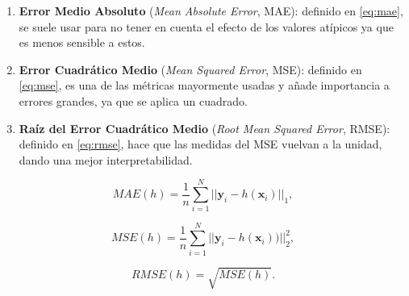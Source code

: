 \begin{enumerate}
  \item \textbf{Error Medio Absoluto} (\emph{Mean Absolute Error}, MAE): definido en \eqref{eq:mae}, se suele usar para no tener en cuenta el efecto de los valores atípicos ya que es menos sensible a estos.
  \item \textbf{Error Cuadrático Medio} (\emph{Mean Squared Error}, MSE): definido en \eqref{eq:mse}, es una de las métricas mayormente usadas y añade importancia a errores grandes, ya que se aplica un cuadrado.
  \item \textbf{Raíz del Error Cuadrático Medio} (\emph{Root Mean Squared Error}, RMSE): definido en \eqref{eq:rmse}, hace que las medidas del MSE vuelvan a la unidad, dando una mejor interpretabilidad.
\end{enumerate}

\begin{equation}
  MAE(h) = \dfrac{1}{n} \sum \limits^N_{i = 1} || \textbf{y}_i - h(\textbf{x}_i) ||_1,
  \label{eq:mae}
\end{equation}

\begin{equation}
  MSE(h) = \dfrac{1}{n} \sum \limits^N_{i = 1} || \textbf{y}_i - h(\textbf{x}_i)) ||^2_2,
  \label{eq:mse}
\end{equation}

\begin{equation}
  RMSE(h) = \sqrt{MSE(h)}.
  \label{eq:rmse}
\end{equation}

\endinput
